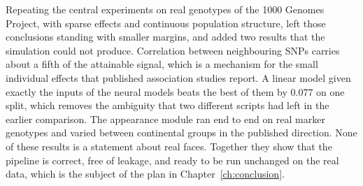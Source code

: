 Repeating the central experiments on real genotypes of the 1000 Genomes Project, with sparse effects and continuous population structure, left those conclusions standing with smaller margins, and added two results that the simulation could not produce. Correlation between neighbouring SNPs carries about a fifth of the attainable signal, which is a mechanism for the small individual effects that published association studies report. A linear model given exactly the inputs of the neural models beats the best of them by $0.077$ on one split, which removes the ambiguity that two different scripts had left in the earlier comparison. The appearance module ran end to end on real marker genotypes and varied between continental groups in the published direction. None of these results is a statement about real faces. Together they show that the pipeline is correct, free of leakage, and ready to be run unchanged on the real data, which is the subject of the plan in Chapter~\ref{ch:conclusion}.
